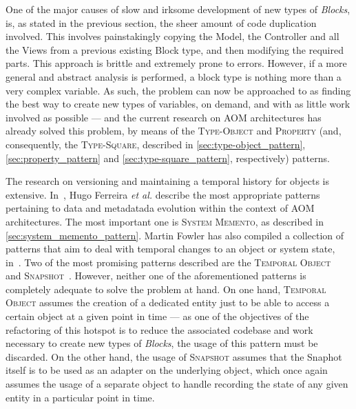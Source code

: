 One of the major causes of slow and irksome development of new types of \emph{Blocks}, is, as stated in the previous section, the sheer amount of code duplication involved. This involves painstakingly copying the Model, the Controller and all the Views from a previous existing Block type, and then modifying the required parts. This approach is brittle and extremely prone to errors. However, if a more general and abstract analysis is performed, a block type is nothing more than a very complex variable. As such, the problem can now be approached to as finding the best way to create new types of variables, on demand, and with as little work involved as possible --- and the current research on AOM architectures has already solved this problem, by means of the \textsc{Type-Object} and \textsc{Property} (and, consequently, the \textsc{Type-Square}, described in \ref{sec:type-object_pattern}, \ref{sec:property_pattern} and \ref{sec:type-square_pattern}, respectively) patterns.

The research on versioning and maintaining a temporal history for objects is extensive. In~\cite{patterns_data_and_metadata_evolution_in_aoms}, Hugo Ferreira \textit{et al.} describe the most appropriate patterns pertaining to data and metadatada evolution within the context of AOM architectures. The most important one is \textsc{System Memento}, as described in \ref{sec:system_memento_pattern}. Martin Fowler has also compiled a collection of patterns that aim to deal with temporal changes to an object or system state, in~\cite{fowler_pattern_for_things_that_change_with_time}. Two of the most promising patterns described are the \textsc{Temporal Object}~\cite{fowler_temporal_object} and \textsc{Snapshot}~\cite{fowler_snapshot}. However, neither one of the aforementioned patterns is completely adequate to solve the problem at hand. On one hand, \textsc{Temporal Object} assumes the creation of a dedicated entity just to be able to access a certain object at a given point in time --- as one of the objectives of the refactoring of this hotspot is to reduce the associated codebase and work necessary to create new types of \emph{Blocks}, the usage of this pattern must be discarded. On the other hand, the usage of \textsc{Snapshot} assumes that the Snaphot itself is to be used as an adapter on the underlying object, which once again assumes the usage of a separate object to handle recording the state of any given entity in a particular point in time.


